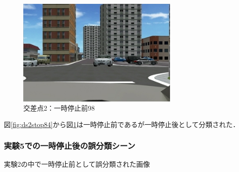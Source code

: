 \newpage

\begin{figure}[htbp]
  \begin{center}
    \includegraphics[clip,width=8.0cm]{./images/ds2stop098.png}
    \caption{交差点2：一時停止前98}
    \label{fig:ds2stop98}
  \end{center}
\end{figure}

図\ref{fig:ds2stop84}から図\ref{fig:ds2stop98}は一時停止前であるが一時停止後として分類された．\\



\subsubsection*{実験5での一時停止後の誤分類シーン}
実験2の中で一時停止前として誤分類された画像\\

